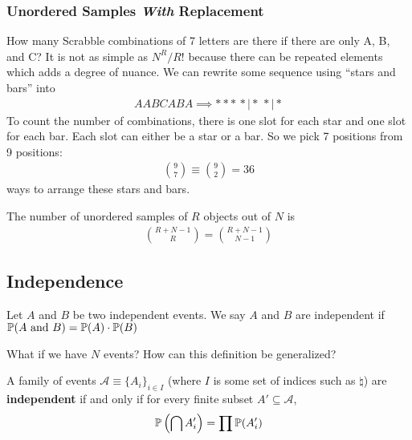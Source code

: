 \subsubsection{Unordered Samples \textit{With} Replacement}
How many Scrabble combinations of 7 letters are there if there are only A, B, and C? It is not as simple as $N^R/R!$ because there can be repeated elements which adds a degree of nuance. We can rewrite some sequence using ``stars and bars'' into
\begin{align}
    AABCABA \implies ***\,* \mid *\,* \mid *
\end{align}
To count the number of combinations, there is one slot for each star and one slot for each bar. Each slot can either be a star or a bar. So we pick 7 positions from 9 positions:
\begin{align}
    \binom{9}{7} \equiv \binom{9}{2} = 36
\end{align}
ways to arrange these stars and bars.
\begin{proposition}
    The number of unordered samples of $R$ objects out of $N$ is
    \begin{align}
        \binom{R+N-1}{R} = \binom{R+N-1}{N-1}
    \end{align}
\end{proposition}

\subsection{Independence}
\begin{proposition}
    Let $A$ and $B$ be two independent events. We say $A$ and $B$ are independent if $\mathbb{P}(A \text{ and } B) = \mathbb{P}(A) \cdot \mathbb{P}(B)$
\end{proposition}
What if we have $N$ events? How can this definition be generalized?
\begin{definition}
    A family of events $\mathcal{A} \equiv \{ A_i \}_{i \in I}$ (where $I$ is some set of indices such as $\natural$) are \textbf{independent} if and only if for every finite subset $A' \subseteq \mathcal{A}$,
    \begin{align}
        \mathbb{P}\left(\bigcap A'_i\right) = \prod \mathbb{P}(A'_i)
    \end{align}
\end{definition}

